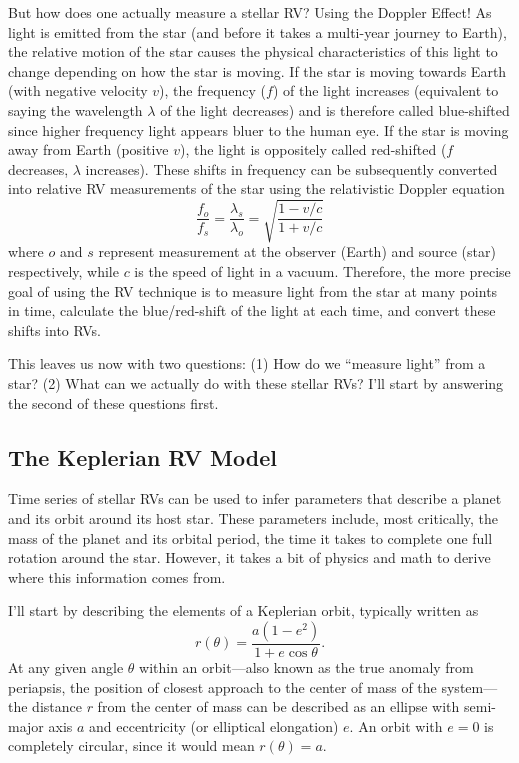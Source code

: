 But how does one actually measure a stellar RV? Using the Doppler Effect! As light is emitted from the star (and before it takes a multi-year journey to Earth), the relative motion of the star causes the physical characteristics of this light to change depending on how the star is moving. If the star is moving towards Earth (with negative velocity $v$), the frequency ($f$) of the light increases (equivalent to saying the wavelength $\lambda$ of the light decreases) and is therefore called blue-shifted since higher frequency light appears bluer to the human eye. If the star is moving away from Earth (positive $v$), the light is oppositely called red-shifted ($f$ decreases, $\lambda$ increases). These shifts in frequency can be subsequently converted into relative RV measurements of the star using the relativistic Doppler equation
\begin{equation}
    \frac{f_o}{f_s} = \frac{\lambda_s}{\lambda_o} = \sqrt{\frac{1 - v/c}{1 + v/c}}
    \label{eq:relative-doppler-effect}
\end{equation}
where $o$ and $s$ represent measurement at the observer (Earth) and source (star) respectively, while $c$ is the speed of light in a vacuum. Therefore, the more precise goal of using the RV technique is to measure light from the star at many points in time, calculate the blue/red-shift of the light at each time, and convert these shifts into RVs.

This leaves us now with two questions: (1) How do we ``measure light'' from a star? (2) What can we actually do with these stellar RVs? I'll start by answering the second of these questions first.

\subsection{The Keplerian RV Model}

Time series of stellar RVs can be used to infer parameters that describe a planet and its orbit around its host star. These parameters include, most critically, the mass of the planet and its orbital period, the time it takes to complete one full rotation around the star. However, it takes a bit of physics and math to derive where this information comes from.

I'll start by describing the elements of a Keplerian orbit, typically written as
\begin{equation}
    r(\theta) = \frac{a (1-e^2)}{1 + e \cos{\theta}}.
    \label{eq:kepler}
\end{equation}
At any given angle $\theta$ within an orbit---also known as the true anomaly from periapsis, the position of closest approach to the center of mass of the system---the distance $r$ from the center of mass can be described as an ellipse with semi-major axis $a$ and eccentricity (or elliptical elongation) $e$. An orbit with $e=0$ is completely circular, since it would mean $r(\theta)=a$.


